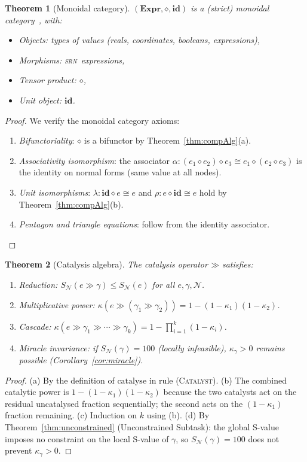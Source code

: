 \documentclass[twocolumn,11pt,a4paper]{article}
\newtheorem{theorem}{Theorem}[section]
\theoremstyle{definition}
\theoremstyle{remark}
\newcommand{\srn}{\textsc{srn}}
\newcommand{\Node}{\mathcal{N}}
\newcommand{\Expr}{\mathbf{Expr}}
\newcommand{\catal}{\mathbin{\gg}}
\newcommand{\comp}{\mathbin{\diamond}}
\begin{document}
\begin{theorem}[Monoidal category]
\label{thm:monoidal}
$(\Expr, \comp, \mathbf{id})$ is a (strict) monoidal
category~\cite{maclane1971categories}, with:
\begin{itemize}[noitemsep,topsep=2pt]
\item Objects: types of values (reals, coordinates, booleans, expressions),
\item Morphisms: \srn\ expressions,
\item Tensor product: $\comp$,
\item Unit object: $\mathbf{id}$.
\end{itemize}
\end{theorem}
\begin{proof}
We verify the monoidal category axioms:
\begin{enumerate}[noitemsep,topsep=2pt]
\item \emph{Bifunctoriality}: $\comp$ is a bifunctor by
  Theorem~\ref{thm:compAlg}(a).
\item \emph{Associativity isomorphism}: the associator
  $\alpha : (e_1 \comp e_2) \comp e_3 \cong e_1 \comp (e_2 \comp e_3)$
  is the identity on normal forms (same value at all nodes).
\item \emph{Unit isomorphisms}: $\lambda : \mathbf{id} \comp e \cong e$
  and $\rho : e \comp \mathbf{id} \cong e$ hold by
  Theorem~\ref{thm:compAlg}(b).
\item \emph{Pentagon and triangle equations}: follow from the identity
  associator.
\end{enumerate}
\end{proof}

\begin{theorem}[Catalysis algebra]
\label{thm:catalyst}
The catalysis operator $\catal$ satisfies:
\begin{enumerate}[label=(\alph*),noitemsep,topsep=2pt]
\item \emph{Reduction}: $S_\Node(e \catal \gamma) \leq S_\Node(e)$
  for all $e, \gamma, \Node$.
\item \emph{Multiplicative power}:
  $\kappa(e \catal (\gamma_1 \catal \gamma_2))
   = 1 - (1-\kappa_1)(1-\kappa_2)$.
\item \emph{Cascade}: $\kappa(e \catal \gamma_1 \catal \cdots \catal \gamma_k)
   = 1 - \prod_{i=1}^k (1 - \kappa_i)$.
\item \emph{Miracle invariance}: if $S_\Node(\gamma) = 100$ (locally
  infeasible), $\kappa_\gamma > 0$ remains possible
  (Corollary~\ref{cor:miracle}).
\end{enumerate}
\end{theorem}
\begin{proof}
(a) By the definition of $\mathrm{catalyse}$ in rule \textsc{(Catalyst)}.
(b) The combined catalytic power is $1 - (1-\kappa_1)(1-\kappa_2)$
because the two catalysts act on the residual uncatalysed fraction
sequentially; the second acts on the $(1-\kappa_1)$ fraction remaining.
(c) Induction on $k$ using (b).
(d) By Theorem~\ref{thm:unconstrained} (Unconstrained Subtask): the
global S-value imposes no constraint on the local S-value of $\gamma$,
so $S_\Node(\gamma) = 100$ does not prevent $\kappa_\gamma > 0$.
\end{proof}
\end{document}
